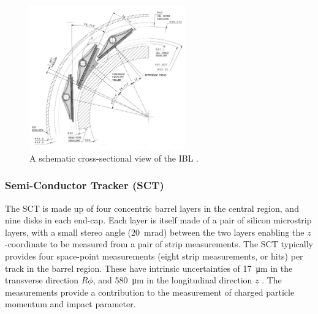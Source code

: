 
\begin{figure}[!htpb]
  \centering
  \includegraphics[width=0.6\textwidth]{chapters/2.detector/figs/atlas_ibl.png}
  \caption{A schematic cross-sectional view of the \ATLAS IBL \cite{ATLAS-TDR-19}.}
  \label{fig:atlas_ibl}
\end{figure}

\subsubsection{Semi-Conductor Tracker (SCT)}
The SCT is made up of four concentric barrel layers in the central region, and nine disks in each end-cap.
Each layer is itself made of a pair of silicon microstrip layers, with a small stereo angle (\SI{20}{\milli\radian}) between the two layers enabling the $z$\nobreakdash-coordinate to be measured from a pair of strip measurements.
The SCT typically provides four space-point measurements (eight strip measurements, or hits) per track in the barrel region.
These have intrinsic uncertainties of \SI{17}{\micro\meter} in the transverse direction $R\phi$, and \SI{580}{\micro\meter} in the longitudinal direction $z$ \cite{IDET-2013-01}.
The measurements provide a contribution to the measurement of charged particle momentum and impact parameter.


